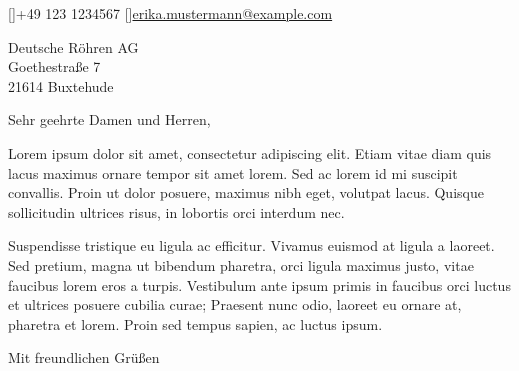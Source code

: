 \documentclass[
DIN5008B,
fromphone=true,
fromemail=true
]{scrlttr2}
\begin{document}
	[]{+49 123 1234567}
	[]{\href{mailto:erika.mustermann@example.com}{erika.mustermann@example.com}}
	
	
	
	
	\begin{letter}{
			Deutsche Röhren AG\\
			Goethestraße 7\\
			21614 Buxtehude
		}
		
		\opening{Sehr geehrte Damen und Herren,}
		
		Lorem ipsum dolor sit amet, consectetur adipiscing elit. Etiam vitae diam quis lacus maximus ornare tempor sit amet lorem. Sed ac lorem id mi suscipit convallis. Proin ut dolor posuere, maximus nibh eget, volutpat lacus. Quisque sollicitudin ultrices risus, in lobortis orci interdum nec.
		
		Suspendisse tristique eu ligula ac efficitur. Vivamus euismod at ligula a laoreet. Sed pretium, magna ut bibendum pharetra, orci ligula maximus justo, vitae faucibus lorem eros a turpis. Vestibulum ante ipsum primis in faucibus orci luctus et ultrices posuere cubilia curae; Praesent nunc odio, laoreet eu ornare at, pharetra et lorem. Proin sed tempus sapien, ac luctus ipsum.
		
		\closing{Mit freundlichen Grüßen}
		
	\end{letter}
\end{document}
